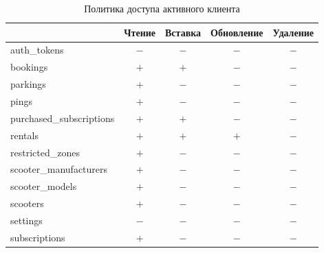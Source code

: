 \begin{table}[H]
	\begin{threeparttable}[b]
		\caption{Политика доступа активного клиента}
		\label{tbl:active-client-policy}
		{\renewcommand{\arraystretch}{1.2}
			\begin{tabularx}{\textwidth}
				{
					| >{\raggedright\arraybackslash}X
					| >{\centering\arraybackslash}c
					| >{\centering\arraybackslash}c
					| >{\centering\arraybackslash}c
					| >{\centering\arraybackslash}c |
				}
				\hline
				                         & \textbf{Чтение}     & \textbf{Вставка} & \textbf{Обновление} & \textbf{Удаление} \\
				\hline
				auth\_tokens             & $-$                 & $-$              & $-$                 & $-$               \\
				\hline
				bookings                 & $+$\rlap{\tnote{1}} & $+$              & $-$                 & $-$               \\
				\hline
				parkings                 & $+$                 & $-$              & $-$                 & $-$               \\
				\hline
				pings                    & $+$\rlap{\tnote{2}} & $-$              & $-$                 & $-$               \\
				\hline
				purchased\_subscriptions & $+$\rlap{\tnote{3}} & $+$              & $-$                 & $-$               \\
				\hline
				rentals                  & $+$\rlap{\tnote{4}} & $+$              & $+$\rlap{\tnote{4}} & $-$               \\
				\hline
				restricted\_zones        & $+$                 & $-$              & $-$                 & $-$               \\
				\hline
				scooter\_manufacturers   & $+$                 & $-$              & $-$                 & $-$               \\
				\hline
				scooter\_models          & $+$                 & $-$              & $-$                 & $-$               \\
				\hline
				scooters                 & $+$\rlap{\tnote{5}} & $-$              & $-$                 & $-$               \\
				\hline
				settings                 & $-$                 & $-$              & $-$                 & $-$               \\
				\hline
				subscriptions            & $+$                 & $-$              & $-$                 & $-$               \\

\end{tabularx}}
\end{threeparttable}
\end{table}
